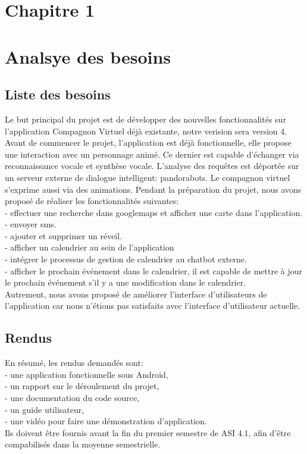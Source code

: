\section*{Chapitre 1}
\section{Analsye des besoins}
\subsection{Liste des besoins}
Le but principal du projet est de développer des nouvelles fonctionnalités sur l'application Compagnon Virtuel déjà existante, notre verision sera version 4.
Avant de commencer le projet, l'application est déjà fonctionnelle, elle propose une interaction avec un personnage animé. Ce dernier est capable d'échanger via reconnaissance vocale et synthèse vocale. L'analyse des requêtes est déportée sur un serveur externe de dialogue intelligent: pandorabots. Le compagnon virtuel s'exprime aussi via des animations. Pendant la préparation du projet, nous avons proposé de réaliser les fonctionnalités suivantes:\\
	\indent- effectuer une recherche dans googlemaps et afficher une carte dans l'application.\\
	\indent- envoyer sms.\\
	\indent- ajouter et supprimer un réveil.\\
	\indent- afficher un calendrier au sein de l'application\\
	\indent- intégrer le processus de gestion de calendrier au chatbot externe.\\
	\indent- afficher le prochain événement dans le calendrier, il est capable de mettre à jour le prochain événement s'il y a une modification dans le calendrier.\\
	
Autrement, nous avons proposé de améliorer l'interface d'utilisateurs de l'application car nous n'étions pas satisfaits avec l'interface d'utilisateur actuelle.

\subsection{Rendus}
En résumé, les rendus demandés sont:\\
    \indent- une application fonctionnelle sous Android,\\
    \indent- un rapport sur le déroulement du projet,\\
    \indent- une documentation du code source,\\
    \indent- un guide utilisateur,\\
	\indent- une vidéo pour faire une démonstration d'application.\\
\indent Ils doivent être fournis avant la fin du premier semestre de ASI 4.1, afin d'être compabilisés dans la moyenne semestrielle.
\newpage
